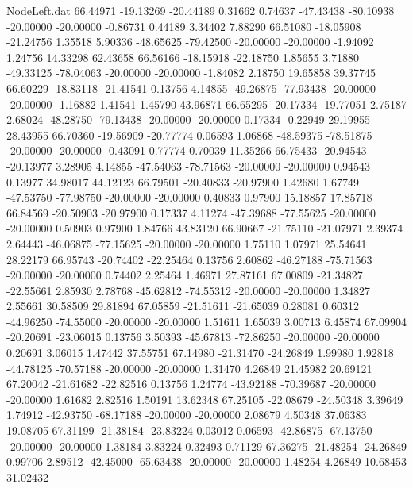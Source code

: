 \begin{filecontents}{NodeLeft.dat}
  66.44971  -19.13269  -20.44189     0.31662    0.74637  -47.43438  -80.10938  -20.00000  -20.00000   -0.86731    0.44189    3.34402    7.88290
  66.51080  -18.05908  -21.24756     1.35518    5.90336  -48.65625  -79.42500  -20.00000  -20.00000   -1.94092    1.24756   14.33298   62.43658
  66.56166  -18.15918  -22.18750     1.85655    3.71880  -49.33125  -78.04063  -20.00000  -20.00000   -1.84082    2.18750   19.65858   39.37745
  66.60229  -18.83118  -21.41541     0.13756    4.14855  -49.26875  -77.93438  -20.00000  -20.00000   -1.16882    1.41541    1.45790   43.96871
  66.65295  -20.17334  -19.77051     2.75187    2.68024  -48.28750  -79.13438  -20.00000  -20.00000    0.17334   -0.22949   29.19955   28.43955
  66.70360  -19.56909  -20.77774     0.06593    1.06868  -48.59375  -78.51875  -20.00000  -20.00000   -0.43091    0.77774    0.70039   11.35266
  66.75433  -20.94543  -20.13977     3.28905    4.14855  -47.54063  -78.71563  -20.00000  -20.00000    0.94543    0.13977   34.98017   44.12123
  66.79501  -20.40833  -20.97900     1.42680    1.67749  -47.53750  -77.98750  -20.00000  -20.00000    0.40833    0.97900   15.18857   17.85718
  66.84569  -20.50903  -20.97900     0.17337    4.11274  -47.39688  -77.55625  -20.00000  -20.00000    0.50903    0.97900    1.84766   43.83120
  66.90667  -21.75110  -21.07971     2.39374    2.64443  -46.06875  -77.15625  -20.00000  -20.00000    1.75110    1.07971   25.54641   28.22179
  66.95743  -20.74402  -22.25464     0.13756    2.60862  -46.27188  -75.71563  -20.00000  -20.00000    0.74402    2.25464    1.46971   27.87161
  67.00809  -21.34827  -22.55661     2.85930    2.78768  -45.62812  -74.55312  -20.00000  -20.00000    1.34827    2.55661   30.58509   29.81894
  67.05859  -21.51611  -21.65039     0.28081    0.60312  -44.96250  -74.55000  -20.00000  -20.00000    1.51611    1.65039    3.00713    6.45874
  67.09904  -20.20691  -23.06015     0.13756    3.50393  -45.67813  -72.86250  -20.00000  -20.00000    0.20691    3.06015    1.47442   37.55751
  67.14980  -21.31470  -24.26849     1.99980    1.92818  -44.78125  -70.57188  -20.00000  -20.00000    1.31470    4.26849   21.45982   20.69121
  67.20042  -21.61682  -22.82516     0.13756    1.24774  -43.92188  -70.39687  -20.00000  -20.00000    1.61682    2.82516    1.50191   13.62348
  67.25105  -22.08679  -24.50348     3.39649    1.74912  -42.93750  -68.17188  -20.00000  -20.00000    2.08679    4.50348   37.06383   19.08705
  67.31199  -21.38184  -23.83224     0.03012    0.06593  -42.86875  -67.13750  -20.00000  -20.00000    1.38184    3.83224    0.32493    0.71129
  67.36275  -21.48254  -24.26849     0.99706    2.89512  -42.45000  -65.63438  -20.00000  -20.00000    1.48254    4.26849   10.68453   31.02432

\end{filecontents}
